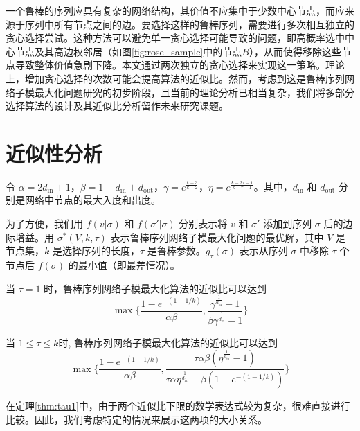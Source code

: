 一个鲁棒的序列应具有复杂的网络结构，其价值不应集中于少数中心节点，而应来源于序列中所有节点之间的边。要选择这样的鲁棒序列，需要进行多次相互独立的贪心选择尝试。这种方法可以避免单一贪心选择可能导致的问题，即高概率选中中心节点及其高边权邻居（如图\ref{fig:rose_sample}中的节点$B$），从而使得移除这些节点导致整体价值急剧下降。本文通过两次独立的贪心选择来实现这一策略。理论上，增加贪心选择的次数可能会提高算法的近似比。然而，考虑到这是鲁棒序列网络子模最大化问题研究的初步阶段，且当前的理论分析已相当复杂，我们将多部分选择算法的设计及其近似比分析留作未来研究课题。

\section{近似性分析}
\label{sec:3_3}

令 $\alpha=2 d_{\text{in}}+1$，$\beta=1+d_{\text{in}}+d_{\text{out}}$，$\gamma=e^{\frac{k-3}{k-2}}$，$\eta=e^{\frac{k-2\tau-1}{k-\tau-1}}$。其中，$d_{\text{in}}$ 和 $d_{\text{out}}$ 分别是网络中节点的最大入度和出度。

为了方便，我们用 $f(v|\sigma)$ 和 $f(\sigma'|\sigma)$ 分别表示将 $v$ 和 $\sigma'$ 添加到序列 $\sigma$ 后的边际增益。用 $\sigma^*(V,k,\tau)$ 表示鲁棒序列网络子模最大化问题的最优解，其中 $V$ 是节点集，$k$ 是选择序列的长度，$\tau$ 是鲁棒参数。$g_\tau(\sigma)$ 表示从序列 $\sigma$ 中移除 $\tau$ 个节点后 $f(\sigma)$ 的最小值（即最差情况）。

\begin{theorem}
\label{thm:tau1}
当 $\tau=1$ 时，鲁棒序列网络子模最大化算法的近似比可以达到
\begin{equation}
\max\{\frac{1-e^{-(1-1/k)}}{\alpha\beta},\frac{\gamma^{\frac{1}{d_{\text{in}}}}-1}{\beta \gamma^{\frac{1}{d_{\text{in}}}}-1}\}\end{equation}
\end{theorem}

\begin{theorem}
\label{thm:tau2}
当 $1\le \tau \le k$时, 鲁棒序列网络子模最大化算法的近似比可以达到
\begin{equation}
 \max\{\frac{1-e^{-(1-1/k)}}{\alpha\beta},\frac{\tau\alpha\beta(\eta^{\frac{1}{d_{\text{in}}}}-1)}{\tau\alpha\eta^{\frac{1}{d_{\text{in}}}}- \beta (1-e^{-(1-1/k)}) }\}    
\end{equation}
\end{theorem}

在定理\ref{thm:tau1}中，由于两个近似比下限的数学表达式较为复杂，很难直接进行比较。因此，我们考虑特定的情况来展示这两项的大小关系。


